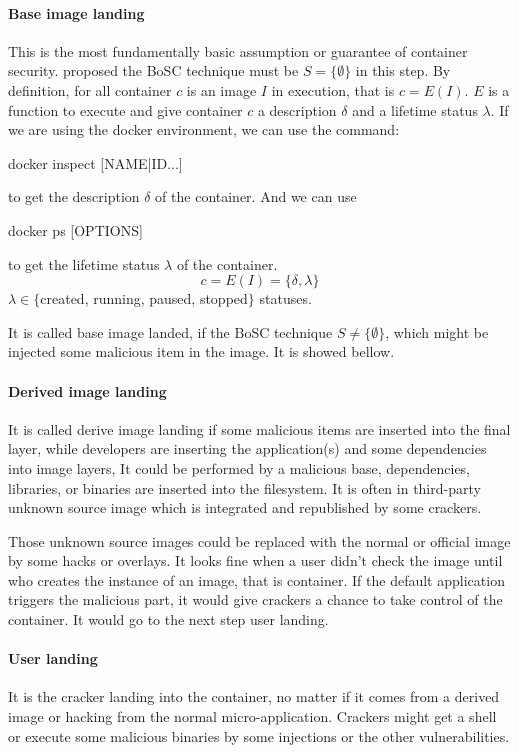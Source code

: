 \paragraph{Base image landing}
This is the most fundamentally basic assumption or guarantee of container security.
\textcite{inproceedings} proposed the BoSC technique must be $S = \{\emptyset\}$ in this step. By definition, for all
container $c$ is an image $I$ in execution, that is  $c = E(I)$. $E$ is a function to execute and
give container $c$ a description $\delta$ and a lifetime status $\lambda$. If we are using the docker environment, we can use the command:
\begin{codebash}
    docker inspect [NAME|ID...]
\end{codebash}
to get the description $\delta$ of the container. And we can use
\begin{codebash}
    docker ps [OPTIONS]
\end{codebash}
to get the lifetime status $\lambda$ of the container.
$$c=E(I)=\{\delta, \lambda\}$$
$\lambda \in \{$created, running, paused, stopped$\}$ statuses.


It is called base image landed, if the BoSC technique $S \neq \{\emptyset\}$, which
might be injected some malicious item in the image. It is showed bellow.


\paragraph{Derived image landing}
It is called derive image landing if some malicious items are inserted into the final layer,
while developers are inserting the application(s) and some dependencies into image layers,
It could be performed by a malicious base, dependencies, libraries, or binaries are inserted
into the filesystem. It is often in third-party unknown source image which is integrated
and republished by some crackers.

Those unknown source images could be replaced with the normal or official image by some hacks or overlays.
It looks fine when a user didn't check the image until who creates the instance of an image, that is container.
If the default application triggers the malicious part, it would give crackers a chance to take control of
the container. It would go to the next step user landing.

\paragraph{User landing}
It is the cracker landing into the container, no matter if it comes from a derived image or hacking from
the normal micro-application. Crackers might get a shell or execute some malicious binaries by
some injections or the other vulnerabilities.


